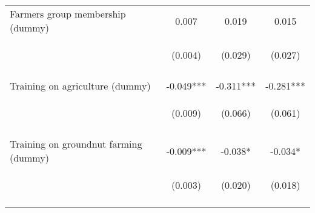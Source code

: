 \begin{center}
\begin{tabular}{lccc}
Farmers group membership (dummy) & 0.007 & 0.019 & 0.015 \\
 & \begin{footnotesize}(0.004)\end{footnotesize} & \begin{footnotesize}(0.029)\end{footnotesize} & \begin{footnotesize}(0.027)\end{footnotesize} \\
\vspace{4pt} & \begin{footnotesize}[0.112]\end{footnotesize} & \begin{footnotesize}[0.510]\end{footnotesize} & \begin{footnotesize}[0.562]\end{footnotesize} \\
Training on agriculture (dummy) & -0.049*** & -0.311*** & -0.281*** \\
 & \begin{footnotesize}(0.009)\end{footnotesize} & \begin{footnotesize}(0.066)\end{footnotesize} & \begin{footnotesize}(0.061)\end{footnotesize} \\
\vspace{4pt} & \begin{footnotesize}[0.000]\end{footnotesize} & \begin{footnotesize}[0.000]\end{footnotesize} & \begin{footnotesize}[0.000]\end{footnotesize} \\
Training on groundnut farming (dummy) & -0.009*** & -0.038* & -0.034* \\
 & \begin{footnotesize}(0.003)\end{footnotesize} & \begin{footnotesize}(0.020)\end{footnotesize} & \begin{footnotesize}(0.018)\end{footnotesize} \\
\vspace{4pt} & \begin{footnotesize}[0.003]\end{footnotesize} & \begin{footnotesize}[0.061]\end{footnotesize} & \begin{footnotesize}[0.067]\end{footnotesize} \\

\end{tabular}
\end{center}
